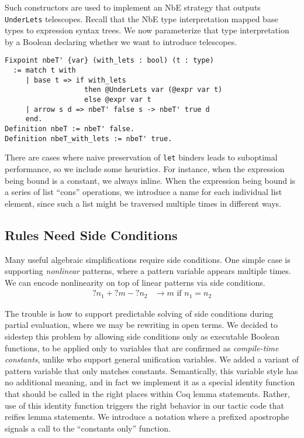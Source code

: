 \documentclass[sigplan,10pt,review,anonymous]{acmart}\settopmatter{printfolios=true,printccs=false,printacmref=false}
\begin{document}
Such constructors are used to implement an NbE strategy that outputs \texttt{UnderLets} telescopes.
Recall that the NbE type interpretation mapped base types to expression syntax trees.
We now parameterize that type interpretation by a Boolean declaring whether we want to introduce telescopes.

\begin{verbatim}
Fixpoint nbeT' {var} (with_lets : bool) (t : type)
  := match t with
     | base t => if with_lets
                   then @UnderLets var (@expr var t)
                   else @expr var t
     | arrow s d => nbeT' false s -> nbeT' true d
     end.
Definition nbeT := nbeT' false.
Definition nbeT_with_lets := nbeT' true.
\end{verbatim}


There are cases where naive preservation of \texttt{let} binders leads to suboptimal performance, so we include some heuristics.
For instance, when the expression being bound is a constant, we always inline.
When the expression being bound is a series of list ``cons'' operations, we introduce a name for each individual list element, since such a list might be traversed multiple times in different ways.

\subsection{Rules Need Side Conditions} \label{sec:side-conditions}

Many useful algebraic simplifications require side conditions.
One simple case is supporting \emph{nonlinear} patterns, where a pattern variable appears multiple times.
We can encode nonlinearity on top of linear patterns via side conditions.
\begin{align*}
  ?n_1 + ?m - ?n_2 & \to m\text{ if }n_1 = n_2
\end{align*}

The trouble is how to support predictable solving of side conditions during partial evaluation, where we may be rewriting in open terms.
We decided to sidestep this problem by allowing side conditions only as executable Boolean functions, to be applied only to variables that are confirmed as \emph{compile-time constants}, unlike \citet{rtac} who support general unification variables.
We added a variant of pattern variable that only matches constants.
Semantically, this variable style has no additional meaning, and in fact we implement it as a special identity function that should be called in the right places within Coq lemma statements.
Rather, use of this identity function triggers the right behavior in our tactic code that reifies lemma statements.
We introduce a notation where a prefixed apostrophe signals a call to the ``constants only'' function.
\end{document}
